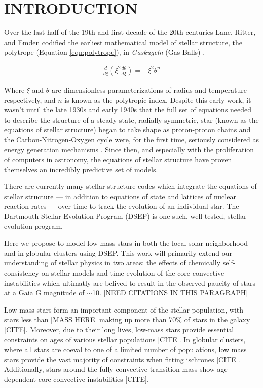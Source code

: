 \section{INTRODUCTION}
Over the last half of the 19th and first decade of the 20th centuries Lane,
Ritter, and Emden codified the earliest mathematical model of stellar
structure, the polytrope (Equation \ref{eqn:polytrope}), in \textit{Gaskugeln}
(Gas Balls) \citep{Emden1907}.

\begin{align}\label{eqn:polytrope}
	\frac{d}{d\xi}\left(\xi^{2}\frac{d\theta}{d\xi}\right) = -\xi^{2}\theta^{n}
\end{align}

Where $\xi$ and $\theta$ are dimensionless parameterizations of radius and
temperature respectively, and $n$ is known as the polytropic index. Despite this
early work, it wasn't until the late 1930s and early 1940s that the full set of
equations needed to describe the structure of a steady state,
radially-symmetric, star (known as the equations of stellar structure) began to
take shape as proton-proton chains and the Carbon-Nitrogen-Oxygen cycle were,
for the first time, seriously considered as energy generation mechanisms
\citep{Cowling1966}. Since then, and especially with the proliferation of
computers in astronomy, the equations of stellar structure have proven
themselves an incredibly predictive set of models.  

There are currently many stellar structure codes \citep[e.g.][]{Dotter2008,
Kovetz2009, Paxton2011} which integrate the equations of stellar structure ---
in addition to equations of state and lattices of nuclear reaction rates ---
over time to track the evolution of an individual star. The Dartmouth Stellar
Evolution Program (DSEP) \citep{Chaboyer2001, Bjork2006, Dotter2008} is one
such, well tested, stellar evolution program.

Here we propose to model low-mass stars in both the local solar neighborhood
and in globular clusters using DSEP. This work will primarily extend our
understanding of stellar physics in two areas: the effects of chemically
self-consistency on stellar models and time evolution of the core-convective
instabilities which ultimatly are belived to result in the observed paucity of
stars at a Gaia G magnitude of $\sim$10. [NEED CITATIONS IN THIS PARAGRAPH]

Low mass stars form an important component of the stellar population, with
stars less than [MASS HERE] making up more than 70\% of stars in the galaxy
[CITE]. Moreover, due to their long lives, low-mass stars provide essential
constraints on ages of various stellar populations [CITE]. In globular
clusters, where all stars are coeval to one of a limited number of populations,
low mass stars provide the vast majority of constraints when fitting ischrones [CITE].
Additionally, stars around the fully-convective transition mass show
age-dependent core-convective instabilities [CITE].

